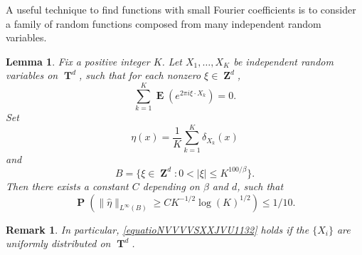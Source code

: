 \documentclass[12pt,reqno]{article}
\numberwithin{equation}{section}
\DeclareMathOperator{\ZZ}{\mathbf{Z}}
\DeclareMathOperator{\TT}{\mathbf{T}}
\newtheorem{lemma}[theorem]{Lemma}
\newtheorem{remark}[theorem]{Remark}
\numberwithin{theorem}{section}
\DeclareMathOperator{\EE}{\mathbf{E}}
\DeclareMathOperator{\PP}{\mathbf{P}}
\begin{document}
A useful technique to find functions with small Fourier coefficients is to consider a family of random functions composed from many independent random variables.

\begin{lemma} \label{LemmaGISCICS1}
    Fix a positive integer $K$. Let $X_1, \dots, X_K$ be independent random variables on $\TT^d$, such that for each nonzero $\xi \in \ZZ^d$,
    \begin{equation} \label{equatioNVVVVSXXJVU1132}
        \sum_{k = 1}^K \EE \left( e^{2 \pi i \xi \cdot X_k} \right) = 0.
    \end{equation}
    Set
    \[ \eta(x) = \frac{1}{K} \sum_{k = 1}^K \delta_{X_k}(x) \]
    and
    \[ B = \{ \xi \in \ZZ^d: 0 < |\xi| \leq K^{100/\beta} \}. \]
    Then there exists a constant $C$ depending on $\beta$ and $d$, such that%
    \[ \PP \left( \| \widehat{\eta} \|_{L^\infty(B)} \geq C K^{-1/2} \log(K)^{1/2} \right) \leq 1/10. \]
\end{lemma}

\begin{remark}
    In particular, \eqref{equatioNVVVVSXXJVU1132} holds if the $\{ X_i \}$ are uniformly distributed on $\TT^d$.
\end{remark}
\end{document}

